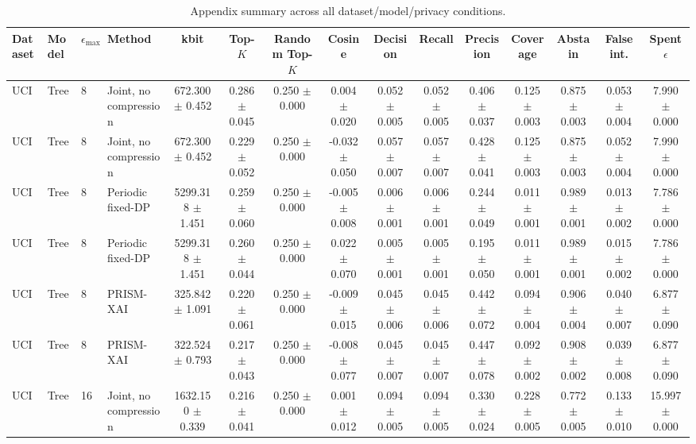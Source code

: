 \begin{table}[t]
\caption{Appendix summary across all dataset/model/privacy conditions.}
\label{tab:appendix-conditions}
\centering
\scriptsize
\setlength{\tabcolsep}{2.5pt}
\begin{tabular}{llllccccccccccc}
\toprule
Dataset & Model & $\epsilon_{\max}$ & Method & kbit & Top-$K$ & Random Top-$K$ & Cosine & Decision & Recall & Precision & Coverage & Abstain & False int. & Spent $\epsilon$ \\
\midrule
UCI & Tree & 8 & Joint, no compression & 672.300 $\pm$ 0.452 & 0.286 $\pm$ 0.045 & 0.250 $\pm$ 0.000 & 0.004 $\pm$ 0.020 & 0.052 $\pm$ 0.005 & 0.052 $\pm$ 0.005 & 0.406 $\pm$ 0.037 & 0.125 $\pm$ 0.003 & 0.875 $\pm$ 0.003 & 0.053 $\pm$ 0.004 & 7.990 $\pm$ 0.000 \\
UCI & Tree & 8 & Joint, no compression & 672.300 $\pm$ 0.452 & 0.229 $\pm$ 0.052 & 0.250 $\pm$ 0.000 & -0.032 $\pm$ 0.050 & 0.057 $\pm$ 0.007 & 0.057 $\pm$ 0.007 & 0.428 $\pm$ 0.041 & 0.125 $\pm$ 0.003 & 0.875 $\pm$ 0.003 & 0.052 $\pm$ 0.004 & 7.990 $\pm$ 0.000 \\
UCI & Tree & 8 & Periodic fixed-DP & 5299.318 $\pm$ 1.451 & 0.259 $\pm$ 0.060 & 0.250 $\pm$ 0.000 & -0.005 $\pm$ 0.008 & 0.006 $\pm$ 0.001 & 0.006 $\pm$ 0.001 & 0.244 $\pm$ 0.049 & 0.011 $\pm$ 0.001 & 0.989 $\pm$ 0.001 & 0.013 $\pm$ 0.002 & 7.786 $\pm$ 0.000 \\
UCI & Tree & 8 & Periodic fixed-DP & 5299.318 $\pm$ 1.451 & 0.260 $\pm$ 0.044 & 0.250 $\pm$ 0.000 & 0.022 $\pm$ 0.070 & 0.005 $\pm$ 0.001 & 0.005 $\pm$ 0.001 & 0.195 $\pm$ 0.050 & 0.011 $\pm$ 0.001 & 0.989 $\pm$ 0.001 & 0.015 $\pm$ 0.002 & 7.786 $\pm$ 0.000 \\
UCI & Tree & 8 & PRISM-XAI & 325.842 $\pm$ 1.091 & 0.220 $\pm$ 0.061 & 0.250 $\pm$ 0.000 & -0.009 $\pm$ 0.015 & 0.045 $\pm$ 0.006 & 0.045 $\pm$ 0.006 & 0.442 $\pm$ 0.072 & 0.094 $\pm$ 0.004 & 0.906 $\pm$ 0.004 & 0.040 $\pm$ 0.007 & 6.877 $\pm$ 0.090 \\
UCI & Tree & 8 & PRISM-XAI & 322.524 $\pm$ 0.793 & 0.217 $\pm$ 0.043 & 0.250 $\pm$ 0.000 & -0.008 $\pm$ 0.077 & 0.045 $\pm$ 0.007 & 0.045 $\pm$ 0.007 & 0.447 $\pm$ 0.078 & 0.092 $\pm$ 0.002 & 0.908 $\pm$ 0.002 & 0.039 $\pm$ 0.008 & 6.877 $\pm$ 0.090 \\
UCI & Tree & 16 & Joint, no compression & 1632.150 $\pm$ 0.339 & 0.216 $\pm$ 0.041 & 0.250 $\pm$ 0.000 & 0.001 $\pm$ 0.012 & 0.094 $\pm$ 0.005 & 0.094 $\pm$ 0.005 & 0.330 $\pm$ 0.024 & 0.228 $\pm$ 0.005 & 0.772 $\pm$ 0.005 & 0.133 $\pm$ 0.010 & 15.997 $\pm$ 0.000 \\

\end{tabular}
\end{table}
